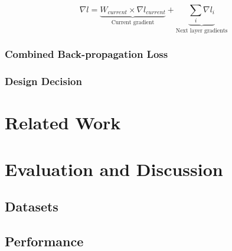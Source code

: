 \documentclass[conference]{IEEEtran}
\begin{document}
\[
\nabla l = \underbrace{W_\textit{current} \times \nabla l_\textit{current}}_{\text{Current gradient}} + \underbrace{\sum_{i}^{} \nabla l_{i}}_{\text{Next layer gradients}}
\]

\subsubsection{Combined Back-propagation Loss}

\subsubsection{Design Decision}






\section{Related Work}

\section{Evaluation and Discussion}
\subsection{Datasets}

\subsection{Performance}
\end{document}
